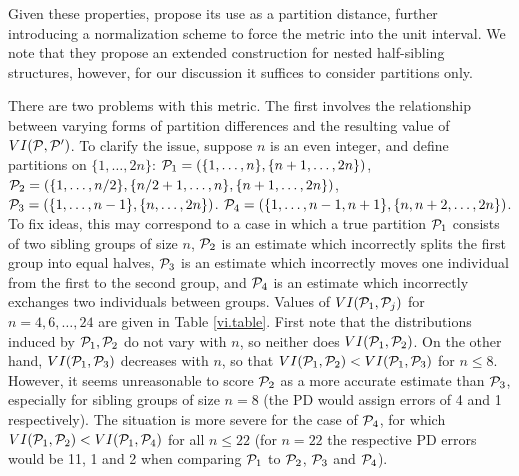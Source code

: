 \documentclass[twoside,10pt,twocolumn]{article}
\newcommand{\calp}{{\cal P}}
\begin{document}
\chead[]{}
 

Given these properties, \citet{BrownDexter2012} propose its use as a partition distance, further introducing 
a normalization scheme to force the metric into the unit interval. We note that they propose an extended 
construction for nested half-sibling structures, however, for our discussion it suffices to consider 
partitions only. 

There are two problems with this metric. The first involves the relationship between varying forms of 
partition differences and the resulting value of  $VI(\calp, \calp^\prime)$. To clarify the issue, suppose 
$n$ is an even integer, and define partitions on $\{ 1,\ldots, 2n \}$: $\calp_1 = ( \{1,\ldots, n\}, \{n+1, 
\ldots, 2n\}  )$,  $\calp_2 = ( \{1, \ldots, n/2\}, \{n/2+1, \ldots,  n\}, \{ n+1, \ldots, 2n\} )$, $\calp_3 
= ( \{1, \ldots, n-1\}, \{n , \ldots, 2n\} )$. $\calp_4 = ( \{1, \ldots, n-1, n+1\}, \{n , n+2, \ldots, 2n
\} )$. To fix ideas, this may correspond to a case in which a true partition $\calp_1$ consists of two 
sibling groups of size $n$,  $\calp_2$ is an estimate which incorrectly splits the first group into equal 
halves, $\calp_3$ is an estimate which incorrectly moves one individual from the first to the second group, 
and $\calp_4$ is an estimate which incorrectly exchanges two individuals between groups.  Values of 
$VI(\calp_1, \calp_j)$ for $n = 4, 6, \ldots, 24$ are given in Table \ref{vi.table}. First note that the 
distributions induced by $\calp_1, \calp_2$ do not vary with $n$, so neither does $VI(\calp_1, \calp_2)$. On 
the other hand, $VI(\calp_1, \calp_3)$ decreases with $n$, so that $VI(\calp_1, \calp_2) <  VI(\calp_1, 
\calp_3)$ for $n \leq 8$. However, it seems unreasonable to score  $\calp_2$ as a more accurate estimate 
than $\calp_3$, especially for sibling groups of size $n = 8$ (the PD would assign errors of 4 and 1 
respectively).  The situation is more severe for the case of $\calp_4$, for which $VI(\calp_1, \calp_2) <  
VI(\calp_1, \calp_4)$ for all $n \leq 22$ (for $n = 22$ the respective PD errors would be 11, 1 and 2 when 
comparing $\calp_1$ to $\calp_2$, $\calp_3$ and $\calp_4$). 
\end{document}

